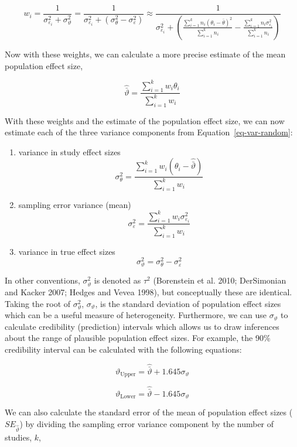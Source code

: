 \documentclass[
  letterpaper,
  DIV=11,
  numbers=noendperiod]{scrreprt}
\providecommand{\tightlist}{%
  \setlength{\itemsep}{0pt}\setlength{\parskip}{0pt}}\usepackage{longtable,booktabs,array}
\begin{document}
\[
w_i = \frac{1}{\sigma^2_{\varepsilon_i}+\sigma_\vartheta^2} = \frac{1}{\sigma^2_{\varepsilon_i}+(\sigma^2_{\theta}-\sigma^2_{\varepsilon})} \approx \frac{1}{\sigma^2_{\varepsilon_i}+\left(\frac{\sum^k_{i=1}n_i(\theta_i - \bar{\theta})^2}{\sum^k_{i=1}n_i}-\frac{\sum^k_{i=1}n_i\sigma^2_{\varepsilon_i}}{\sum^k_{i=1}n_i}\right)}
\]

Now with these weights, we can calculate a more precise estimate of the
mean population effect size,

\[
\hat{\bar{\vartheta}} = \frac{\sum^k_{i=1}w_i\theta_i}{\sum^k_{i=1}w_i}
\]

With these weights and the estimate of the population effect size, we
can now estimate each of the three variance components from
Equation~\ref{eq-var-random}:

\begin{enumerate}
\def\labelenumi{\arabic{enumi})}
\tightlist
\item
  variance in study effect sizes \[
  \sigma^2_{\theta}=\frac{\sum^k_{i=1}w_i(\theta_i - \hat{\bar{\vartheta}})}{\sum^k_{i=1}w_i}
  \]
\item
  sampling error variance (mean) \[
  \sigma^2_{\varepsilon} = \frac{\sum^k_{i=1}w_i\sigma^2_{\varepsilon_i}}{\sum^k_{i=1}w_i}
  \]
\item
  variance in true effect sizes \[
  \sigma^2_{\vartheta} = \sigma^2_{\theta} - \sigma^2_{\varepsilon}
  \]
\end{enumerate}

In other conventions, \(\sigma^2_\vartheta\) is denoted as \(\tau^2\)
(Borenstein et al. 2010; DerSimonian and Kacker 2007; Hedges and Vevea
1998), but conceptually these are identical. Taking the root of
\(\sigma^2_\vartheta\), \(\sigma_\vartheta\), is the standard deviation
of population effect sizes which can be a useful measure of
heterogeneity. Furthermore, we can use \(\sigma_\vartheta\) to calculate
credibility (prediction) intervals which allows us to draw inferences
about the range of plausible population effect sizes. For example, the
90\% credibility interval can be calculated with the following
equations:

\[
\vartheta_\text{Upper} = \hat{\bar{\vartheta}} + 1.645\sigma_\vartheta
\]

\[
\vartheta_\text{Lower} = \hat{\bar{\vartheta}} - 1.645\sigma_\vartheta
\]

We can also calculate the standard error of the mean of population
effect sizes (\(SE_{\hat{\bar{\vartheta}}}\)) by dividing the sampling
error variance component by the number of studies, \(k\),
\end{document}

